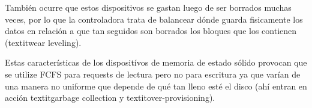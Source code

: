 También ocurre que estos dispositivos se gastan luego de ser borrados muchas veces, por lo que la controladora trata de balancear dónde guarda fisicamente los datos en relación a que tan seguidos son borrados los bloques que los contienen (textit{wear leveling}).

Estas características de los dispositívos de memoria de estado sólido provocan que se utilize FCFS para requests de lectura pero no para escritura ya que varían de una manera no uniforme que depende de qué tan lleno esté el disco (ahí entran en acción textit{garbage collection} y textit{over-provisioning}).